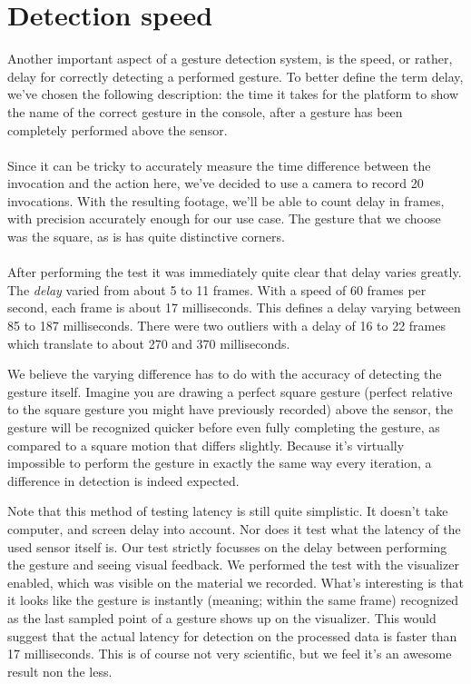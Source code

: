 \documentclass[a4paper]{article}
\begin{document}
  \section{Detection speed}
  Another important aspect of a gesture detection system, is the speed, or
  rather, delay for correctly detecting a performed gesture. To better define
  the term delay, we've chosen the following description: the time it takes for
  the platform to show the name of the correct gesture in the console, after a
  gesture has been completely performed above the sensor.

  \paragraph{}
  Since it can be tricky to accurately measure the time difference between the
  invocation and the action here, we've decided to use a camera to record 20
  invocations. With the resulting footage, we'll be able to count delay in
  frames, with precision accurately enough for our use case. The gesture that we
  choose was the square, as is has quite distinctive corners.

  \paragraph{}
  After performing the test it was immediately quite clear that delay varies
  greatly. The \emph{delay} varied from about 5 to 11 frames. With a speed of 60
  frames per second, each frame is about 17 milliseconds. This defines a delay
  varying between 85 to 187 milliseconds. There were two outliers with a delay
  of 16 to 22 frames which translate to about 270 and 370 milliseconds.

  We believe the varying difference has to do with the accuracy of detecting the gesture
  itself. Imagine you are drawing a perfect square gesture (perfect relative to
  the square gesture you might have previously recorded) above the sensor, the
  gesture will be recognized quicker before even fully completing the gesture,
  as compared to a square motion that differs slightly. Because it's virtually
  impossible to perform the gesture in exactly the same way every iteration, a
  difference in detection is indeed expected.

  Note that this method of testing latency is still quite simplistic. It doesn't
  take computer, and screen delay into account. Nor does it test what the
  latency of the used sensor itself is. Our test strictly focusses on the delay
  between performing the gesture and seeing visual feedback. We performed the
  test with the visualizer enabled, which was visible on the material we
  recorded. What's interesting is that it looks like the gesture is instantly
  (meaning; within the same frame) recognized as the last sampled point of a
  gesture shows up on the visualizer. This would suggest that the actual
  latency for detection on the processed data is faster than 17 milliseconds.
  This is of course not very scientific, but we feel it's an awesome result non
  the less.
\end{document}
